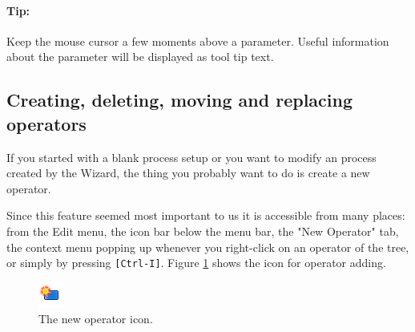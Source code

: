 \documentclass[11pt]{article}
\newcommand{\key}[1]{\texttt{[#1]}}
\newcommand{\useroption}[1]{\textsf{#1}}
\begin{document}
\paragraph{Tip:} Keep the mouse cursor a few moments above a
parameter. Useful information about the parameter will be displayed
as tool tip text.



\subsection{Creating, deleting, moving and replacing operators}

If you started with a blank process setup or you want to modify an
process created by the Wizard, the thing you probably want to do is
create a new operator. 

Since this feature seemed most important to us
it is accessible from many places: from the \useroption{Edit} menu,
the icon bar below the menu bar, the "New Operator" tab, the context
menu popping up whenever you right-click on an operator of the tree,
or simply by pressing \key{Ctrl-I}. Figure \ref{fig:operator_new}
shows the icon for operator adding.
\begin{figure}[ht]
\center
\includegraphics[width=0.08\linewidth]{new_operator.png}
\caption{The new operator icon.}
\label{fig:operator_new}
\end{figure}
\end{document}
